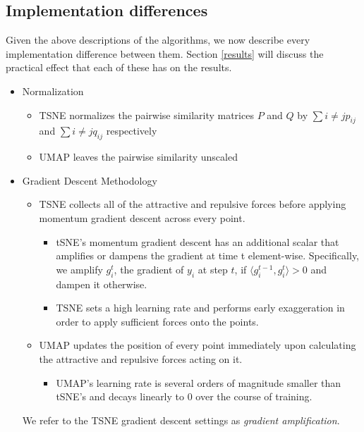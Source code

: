 \documentclass[sigconf, nonacm]{acmart}
\begin{document}
\subsection{Implementation differences} \label{implementation_diffs}
Given the above descriptions of the algorithms, we now describe every implementation difference between them. Section \ref{results} will discuss the
practical effect that each of these has on the results.

\begin{itemize}
    \item Normalization
        \begin{itemize}
            \item TSNE normalizes the pairwise similarity matrices $P$ and $Q$ by $\sum i \neq j p_{ij}$ and $\sum i \neq j q_{ij}$ respectively
            \item UMAP leaves the pairwise similarity unscaled
        \end{itemize}

    \item Gradient Descent Methodology
        \begin{itemize}
        \item TSNE collects all of the attractive and repulsive forces before applying momentum gradient descent across every point.
            \begin{itemize}
                \item tSNE's momentum gradient descent has an additional scalar that amplifies or dampens the gradient at time t element-wise. Specifically, we
                    amplify $g_i^t$, the gradient of $y_i$ at step $t$, if $\langle g_i^{t-1}, g_i^t \rangle > 0$ and dampen it otherwise.
                \item TSNE sets a high learning rate and performs early exaggeration \cite{van2008visualizing} in order to apply sufficient forces onto the points.
            \end{itemize}
        \item UMAP updates the position of every point immediately upon calculating the attractive and repulsive forces acting on it.
            \begin{itemize}
                \item UMAP's learning rate is several orders of magnitude smaller than tSNE's and decays linearly to 0 over the course of training.
            \end{itemize}
        \end{itemize}
        We refer to the TSNE gradient descent settings as \textit{gradient amplification}.


\end{itemize}
\end{document}
